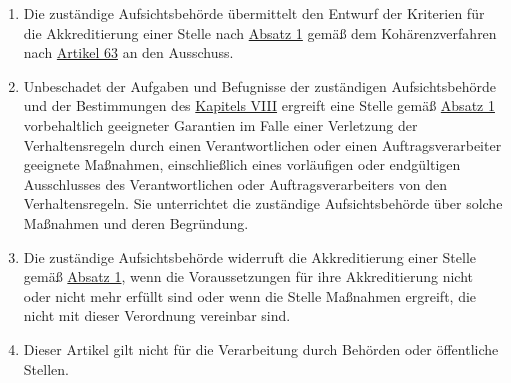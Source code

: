 \begin{enumerate}
\begin{enumerate}
  \end{enumerate}

  \item Die zuständige Aufsichtsbehörde übermittelt den Entwurf der Kriterien für die Akkreditierung einer Stelle nach
   \hyperref[itm:41-1]{Absatz 1} gemäß dem Kohärenzverfahren nach \hyperref[ch:63]{Artikel 63} an den Ausschuss.
  \label{itm:41-3}

  \item Unbeschadet der Aufgaben und Befugnisse der zuständigen Aufsichtsbehörde und der Bestimmungen des \hyperref
   [part:8]{Kapitels VIII} ergreift eine Stelle gemäß \hyperref[itm:41-1]{Absatz 1} vorbehaltlich geeigneter Garantien
   im Falle einer Verletzung der Verhaltensregeln durch einen Verantwortlichen oder einen Auftragsverarbeiter geeignete
   Maßnahmen, einschließlich eines vorläufigen oder endgültigen Ausschlusses des Verantwortlichen oder
   Auftragsverarbeiters von den Verhaltensregeln. Sie unterrichtet die zuständige Aufsichtsbehörde über solche
   Maßnahmen und deren Begründung.
  \label{itm:41-4}

  \item Die zuständige Aufsichtsbehörde widerruft die Akkreditierung einer Stelle gemäß \hyperref[itm:41-1]{Absatz 1},
   wenn die Voraussetzungen für ihre Akkreditierung nicht oder nicht mehr erfüllt sind oder wenn die Stelle Maßnahmen
   ergreift, die nicht mit dieser Verordnung vereinbar sind.
  \label{itm:41-5}

  \item Dieser Artikel gilt nicht für die Verarbeitung durch Behörden oder öffentliche Stellen.
  \label{itm:41-6}

\end{enumerate}


